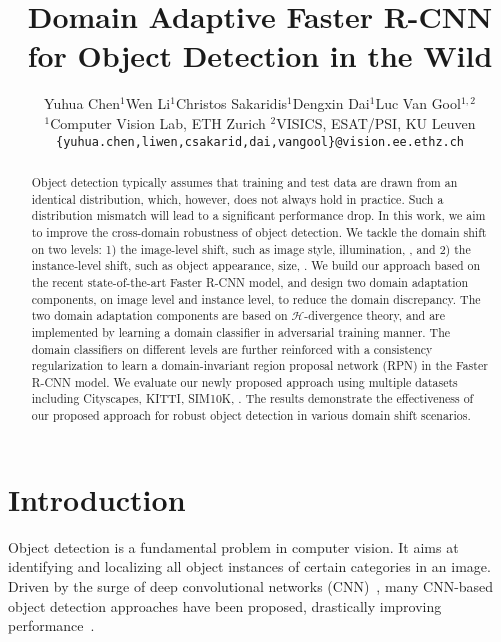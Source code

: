\documentclass[10pt,twocolumn,letterpaper]{article}
\def\cH{\mathcal{H}}
\begin{document}
\title{Domain Adaptive Faster R-CNN for Object Detection in the Wild}

\author{Yuhua Chen$^1$\hspace{5mm}Wen Li$^1$\hspace{5mm}Christos Sakaridis$^1$\hspace{5mm}Dengxin Dai$^1$\hspace{5mm}Luc Van Gool$^{1,2}$\\[2mm]
$^1$Computer Vision Lab, ETH Zurich\hspace{10mm}
$^2$VISICS, ESAT/PSI, KU Leuven\\[-1.5pt]
{\tt\small \{yuhua.chen,liwen,csakarid,dai,vangool\}@vision.ee.ethz.ch}
}

\maketitle


\begin{abstract}
Object detection typically assumes that training and test data are drawn from an identical distribution, which, however, does not always hold in practice. Such a distribution mismatch will lead to a significant performance drop. In this work, we aim to improve the cross-domain robustness of object detection. We tackle the domain shift on two levels: 1) the image-level shift, such as image style, illumination, \etc, and 2) the instance-level shift, such as object appearance, size, \etc. We build our approach based on the recent state-of-the-art Faster R-CNN model, and design two domain adaptation components, on image level and instance level, to reduce the domain discrepancy. The two domain adaptation components are based on $\cH$-divergence theory, and are implemented by learning a domain classifier in adversarial training manner. The domain classifiers on different levels are further reinforced with a consistency regularization to learn a domain-invariant region proposal network (RPN) in the Faster R-CNN model. We evaluate our newly proposed approach using multiple datasets including Cityscapes, KITTI, SIM10K, \etc. The results demonstrate the effectiveness of our proposed approach for robust object detection in various domain shift scenarios.
\end{abstract}

\section{Introduction}
\label{sec:intro}
Object detection is a fundamental problem in computer vision. It aims at identifying and localizing all object instances of certain categories in an image. Driven by the surge of deep convolutional networks (CNN)~\cite{krizhevsky2012imagenet}, many CNN-based object detection approaches have been proposed, drastically improving performance~\cite{girshick2014rich,sermanet2013overfeat,girshick2015fast,li2016r,gidaris2015object,liu2016ssd}.
\end{document}
